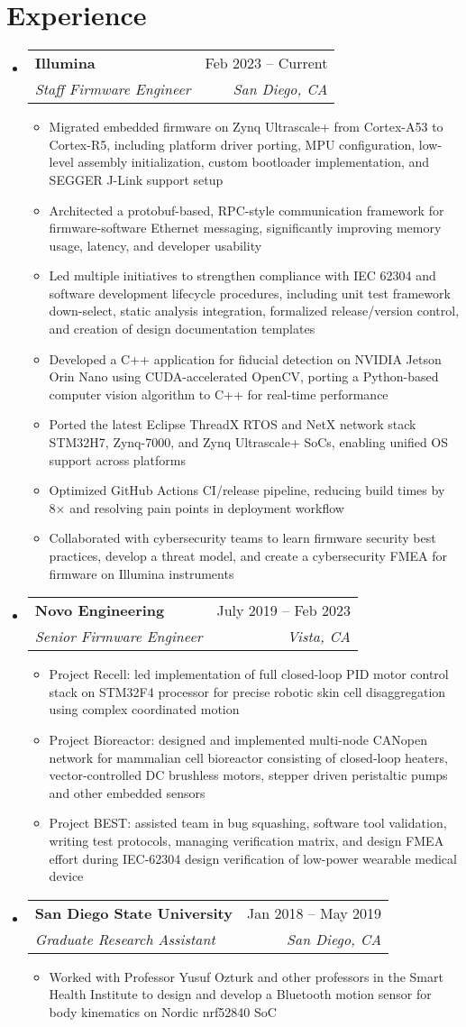 \documentclass[letterpaper,10pt]{article}
\makeatletter
\newcommand{\resumeItem}[1]{
  \item\small{
    {#1 \vspace{-2pt}}
  }
}
\newcommand{\resumeSubheading}[4]{
  \vspace{-2pt}\item
    \begin{tabular*}{0.97\textwidth}[t]{l@{\extracolsep{\fill}}r}
      \textbf{#1} & #2 \\
      \textit{\small#3} & \textit{\small #4} \\
    \end{tabular*}\vspace{-7pt}
}
\newcommand{\resumeSubHeadingListStart}{\begin{itemize}[leftmargin=0.15in, label={}]}
\newcommand{\resumeSubHeadingListEnd}{\end{itemize}}
\newcommand{\resumeItemListStart}{\begin{itemize}}
\newcommand{\resumeItemListEnd}{\end{itemize}\vspace{-5pt}}
\makeatother
\begin{document}
\section{Experience}
  \resumeSubHeadingListStart
    \resumeSubheading
      {Illumina}{Feb 2023 -- Current}
      {Staff Firmware Engineer}{San Diego, CA}
      \resumeItemListStart
        \resumeItem{Migrated embedded firmware on Zynq Ultrascale+ from Cortex-A53 to Cortex-R5, including platform driver porting, MPU configuration, low-level assembly initialization, custom bootloader implementation, and SEGGER J-Link support setup}
        \resumeItem{Architected a protobuf-based, RPC-style communication framework for firmware-software Ethernet messaging, significantly improving memory usage, latency, and developer usability}
        \resumeItem{Led multiple initiatives to strengthen compliance with IEC 62304 and software development lifecycle procedures, including unit test framework down-select, static analysis integration, formalized release/version control, and creation of design documentation templates}
        \resumeItem{Developed a C++ application for fiducial detection on NVIDIA Jetson Orin Nano using CUDA-accelerated OpenCV, porting a Python-based computer vision algorithm to C++ for real-time performance}
        \resumeItem{Ported the latest Eclipse ThreadX RTOS and NetX network stack STM32H7, Zynq-7000, and Zynq Ultrascale+ SoCs, enabling unified OS support across platforms}
        \resumeItem{Optimized GitHub Actions CI/release pipeline, reducing build times by 8× and resolving pain points in deployment workflow}
        \resumeItem{Collaborated with cybersecurity teams to learn firmware security best practices, develop a threat model, and create a cybersecurity FMEA for firmware on Illumina instruments}
      \resumeItemListEnd
    \resumeSubheading
      {Novo Engineering}{July 2019 -- Feb 2023}
      {Senior Firmware Engineer}{Vista, CA}
      \resumeItemListStart
        \resumeItem{Project Recell: led implementation of full closed-loop PID motor control stack on STM32F4 processor for precise robotic skin cell disaggregation using complex coordinated motion}
        \resumeItem{Project Bioreactor: designed and implemented multi-node CANopen network for mammalian cell bioreactor consisting of closed-loop heaters, vector-controlled DC brushless motors, stepper driven peristaltic pumps and other embedded sensors}     
        \resumeItem{Project BEST: assisted team in bug squashing, software tool validation, writing test protocols, managing verification matrix, and design FMEA effort during IEC-62304 design verification of low-power wearable medical device }
        \resumeItemListEnd
    \resumeSubheading
      {San Diego State University}{Jan 2018 -- May 2019}
      {Graduate Research Assistant}{San Diego, CA}
      \resumeItemListStart
        \resumeItem{Worked with Professor Yusuf Ozturk and other professors in the Smart Health Institute to design and develop a Bluetooth motion sensor for body kinematics on Nordic nrf52840 SoC}
      \resumeItemListEnd
  \resumeSubHeadingListEnd
\end{document}
